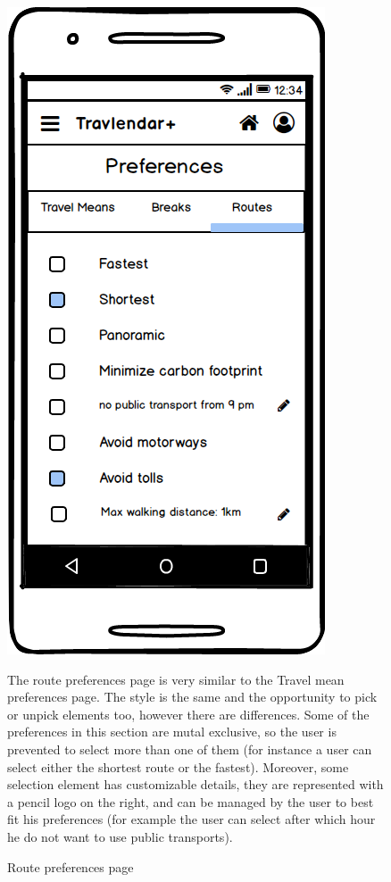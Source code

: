 		\begin{figure}
		\centering
		\includegraphics[width=0.6\linewidth]{mockups/PreferencesRoutes}
		\caption{Route preferences page}
		\label{fig:preferencesroutes}
		\begin{center}
			The route preferences page is very similar to the Travel mean preferences page. The style is the same and the opportunity to pick or unpick elements too, however there are differences. Some of the preferences in this section are mutal exclusive, so the user is prevented to select more than one of them (for instance a user can select either the shortest route or the fastest). Moreover, some selection element has customizable details, they are represented with a pencil logo on the right, and can be managed by the user to best fit his preferences (for example the user can select after which hour he do not want to use public transports).
		\end{center}
	\end{figure}
	
